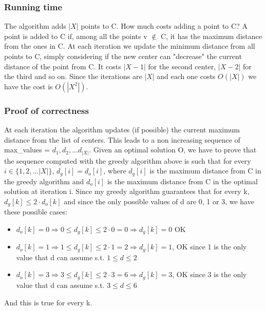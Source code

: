 \subsubsection{Running time}
The algorithm adds $|X|$ points to C. How much costs adding a point to C? A point is added to C if, among all the points v $\notin$ C, it has the maximum distance from the ones in C. At each iteration we update the minimum distance from all points to C, simply considering if the new center can "decrease" the current distance of the point from C. It costs $|X - 1|$ for the second center, $|X - 2|$ for the third and so on. Since the iterations are $|X|$ and each one costs $O(|X|)$ we have the cost is $O(|X^2|)$.
\subsubsection{Proof of correctness}
At each iteration the algorithm updates (if possible) the current maximum distance from the list of centers. This leads to a non increasing sequence of max\_values = ${d_1, d_2, ... d_{|X|}}$. Given an optimal solution O, we have to prove that the sequence computed with the greedy algorithm above is such that for every $i \in \{1, 2, ... |X|\}$, $d_g[i] = d_o[i] $, where $d_g[i]$ is the maximum distance from C in the greedy algorithm and $d_o[i]$ is the maximum distance from C in the optimal solution at iteration i. Since my greedy algorithm guarantees \cite{K-center} that for every k, $d_g[k] \leq 2 \cdot d_o[k]$ and since the only possible values of d are 0, 1 or 3, we have these possible cases:
\begin{itemize}
	\item $d_o[k] = 0 \Rightarrow  0 \leq d_g[k] \leq 2\cdot0 = 0 \Rightarrow d_g[k] = 0$ OK
	\item $d_o[k] = 1 \Rightarrow  1 \leq d_g[k] \leq 2\cdot1 = 2 \Rightarrow d_g[k] = 1 $, OK since 1 is the only value that d can assume s.t. $1 \leq d \leq 2$
	\item $d_o[k] = 3 \Rightarrow  3 \leq d_g[k] \leq 2\cdot3 = 6 \Rightarrow d_g[k] = 3 $, OK since 3 is the only value that d can assume s.t. $3 \leq d \leq 6$
\end{itemize}
And this is true for every k.